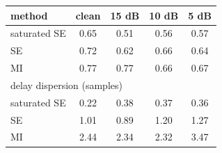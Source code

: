 \begin{tabular}{lcccc}
\toprule
method & clean & 15 dB & 10 dB & 5 dB \\
\midrule
saturated SE & 0.65 & 0.51 & 0.56 & 0.57 \\
SE & 0.72 & 0.62 & 0.66 & 0.64 \\
MI & 0.77 & 0.77 & 0.66 & 0.67 \\
\midrule
\multicolumn{5}{l}{delay dispersion (samples)}\\
saturated SE & 0.22 & 0.38 & 0.37 & 0.36 \\
SE & 1.01 & 0.89 & 1.20 & 1.27 \\
MI & 2.44 & 2.34 & 2.32 & 3.47 \\
\bottomrule
\end{tabular}
